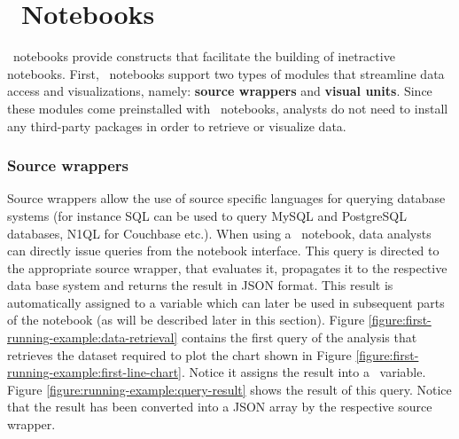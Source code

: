 
\section{\projname\ Notebooks}

\projname\ notebooks provide constructs that facilitate the building of inetractive notebooks.  First, \projname\ notebooks support two types of modules that streamline data access and visualizations, namely: \textbf{source wrappers} and \textbf{visual units}. Since these modules come preinstalled with \projname\ notebooks, analysts do not need to install any third-party packages in order to retrieve or visualize data. 




\subsubsection*{Source wrappers}

Source wrappers allow the use of source specific languages for querying database systems (for instance SQL can be used to query MySQL and PostgreSQL databases, N1QL for Couchbase etc.). When using a \projname\ notebook, data analysts can directly issue queries from the notebook interface. This query is directed to the appropriate source wrapper, that evaluates it, propagates it to the respective data base system and returns the result in JSON format. This result is automatically assigned to a variable which can later be used in subsequent parts of the notebook (as will be described later in this section). Figure \ref{figure:first-running-example:data-retrieval} contains the first query of the analysis that retrieves the dataset required to plot the chart shown in Figure \ref{figure:first-running-example:first-line-chart}.  Notice it assigns the result into a \projname\ variable. Figure \ref{figure:running-example:query-result} shows the result of this query. Notice that the result has been converted into a JSON array by the respective source wrapper. 

